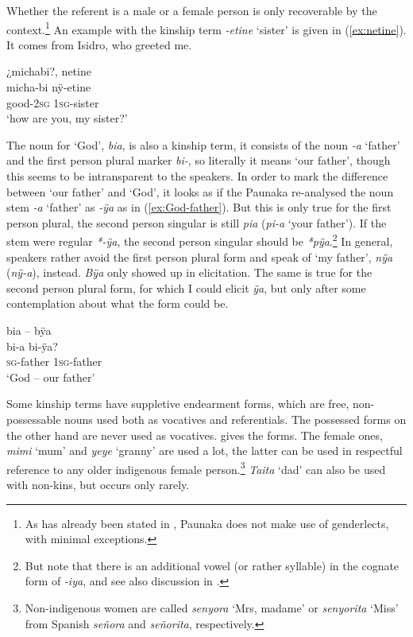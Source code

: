 Whether the referent is a male or a female person is only recoverable by the context.\footnote{As has already been stated in , Paunaka does not make use of genderlects, with minimal exceptions.} An example with the kinship term \textit{-etine} ‘sister’ is given in (\ref{ex:netine}). It comes from Isidro, who greeted me.

\ea\label{ex:netine}
\begingl 
\glpreamble ¿michabi?, netine\\
\gla micha-bi nÿ-etine\\ 
\glb good-2\textsc{sg} 1\textsc{sg}-sister\\ 
\glft ‘how are you, my sister?’\\ 
\endgl
\trailingcitation{[mdx-c120416ls.008]}
\xe

The noun for ‘God’, \textit{bia}, is also a kinship term, it consists of the noun \textit{-a} ‘father’ and the first person plural marker \textit{bi-}, so literally it means ‘our father’, though this seems to be intransparent to the speakers. In order to mark the difference between ‘our father’ and ‘God’, it looks as if the Paunaka re-analysed the noun stem \textit{-a} ‘father’ as \textit{-ÿa} as in (\ref{ex:God-father}). But this is only true for the first person plural, the second person singular is still \textit{pia} (\textit{pi-a} ‘your father’). If the stem were regular \textit{*-ÿa}, the second person singular should be \textit{*pÿa}.\footnote{But note that there is an additional vowel (or rather syllable) in the cognate form of  \textit{-iya}, and see also discussion in .} In general, speakers rather avoid the first person plural form and speak of ‘my father’, \textit{nÿa} (\textit{nÿ-a}), instead. \textit{Bÿa} only showed up in elicitation. The same is true for the second person plural form, for which I could elicit \textit{ÿa}, but only after some contemplation about what the form could be.

\ea\label{ex:God-father}
\begingl 
\glpreamble bia – bÿa\\
\gla bi-a bi-ÿa?\\ 
\textsc{sg}-father 1\textsc{sg}-father\\ 
\glft ‘God – our father’\\ 
\endgl
\xe


Some kinship terms have suppletive endearment forms,  which are free, non-possess\-able nouns used both as vocatives and referentials. The possessed forms on the other hand are never used as vocatives.  gives the forms.
The female ones, \textit{mimi} ‘mum’ and \textit{yeye} ‘granny’ are used a lot, the latter can be used in respectful reference to any older indigenous female person.\footnote{Non-indigenous women are called \textit{senyora} ‘Mrs, madame’ or \textit{senyorita} ‘Miss’ from Spanish \textit{señora} and \textit{señorita}, respectively.} \textit{Taita} ‘dad’ can also be used with non-kins, but occurs only rarely.

